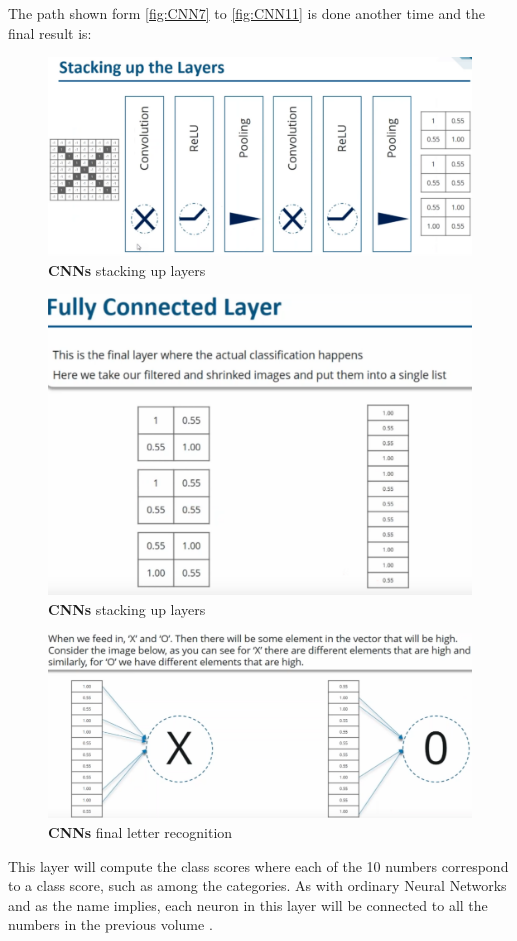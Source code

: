 \documentclass[11pt]{article}
\begin{document}
The path shown form \ref{fig:CNN7} to \ref{fig:CNN11} is done another time and the final result is:
\begin{figure}[h]
\centering
\captionsetup{justification=centering}
\includegraphics[width=0.9\linewidth]{CNN12.pdf}
\caption{ \textbf{CNNs} stacking up layers}
\label{fig:CNN12}
\end{figure}
\clearpage
\begin{figure}[h]
\centering
\captionsetup{justification=centering}
\includegraphics[width=0.7\linewidth]{CNN13.pdf}
\caption{ \textbf{CNNs} stacking up layers}
\label{fig:CNN13}
\end{figure}
\begin{figure}[h]
\centering
\captionsetup{justification=centering}
\includegraphics[width=0.97\linewidth]{CNN14.pdf}
\caption{ \textbf{CNNs} final letter recognition}
\label{fig:CNN14}
\end{figure}
This layer will compute the class scores where each of the 10 numbers correspond to a class score, such as among the categories. As with ordinary Neural Networks and as the name implies, each neuron in this layer will be connected to all the numbers in the previous volume \cite{CNSU}.
\end{document}
